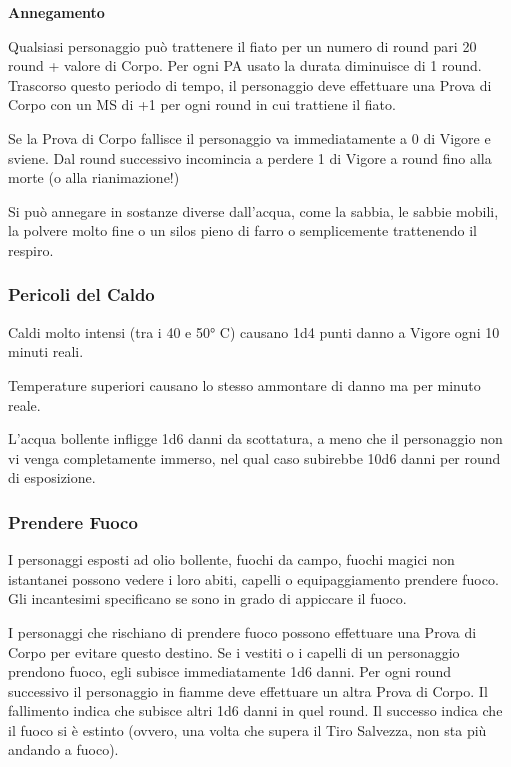 \documentclass[12pt,a4paper,twoside,openany]{book}
\begin{document}
\begin{multicols}{2}
\textbf{Annegamento}\hypertarget{trattenereilfiato}{}

Qualsiasi personaggio può trattenere il fiato per un numero di round pari 20 round + valore di Corpo. Per ogni PA usato la durata diminuisce di 1 round. Trascorso questo periodo di tempo, il personaggio deve effettuare una Prova di Corpo con un MS di +1 per ogni round in cui trattiene il fiato.

Se la Prova di Corpo fallisce il personaggio va immediatamente a 0 di Vigore e sviene. Dal round successivo incomincia a perdere 1 di Vigore a round fino alla morte (o alla rianimazione!)

Si può annegare in sostanze diverse dall'acqua, come la sabbia, le sabbie mobili, la polvere molto fine o un silos pieno di farro o semplicemente trattenendo il respiro.

\subsubsection{Pericoli del Caldo}

\label{pericoli-del-caldo}

Caldi molto intensi (tra i 40 e 50° C) causano 1d4 punti danno a Vigore ogni 10 minuti reali.

Temperature superiori causano lo stesso ammontare di danno ma per minuto reale.

L'acqua bollente infligge 1d6 danni da scottatura, a meno che il personaggio non vi venga completamente immerso, nel qual caso subirebbe 10d6 danni per round di esposizione.

\subsubsection{Prendere Fuoco}

\label{prendere-fuoco}

I personaggi esposti ad olio bollente, fuochi da campo, fuochi magici non istantanei possono vedere i loro abiti, capelli o equipaggiamento prendere fuoco. Gli incantesimi specificano se sono in grado di appiccare il fuoco.

I personaggi che rischiano di prendere fuoco possono effettuare una Prova di Corpo per evitare questo destino. Se i vestiti o i capelli di un personaggio prendono fuoco, egli subisce immediatamente 1d6 danni. Per ogni round successivo il personaggio in fiamme deve effettuare un altra Prova di Corpo. Il fallimento indica che subisce altri 1d6 danni in quel round. Il successo indica che il fuoco si è estinto (ovvero, una volta che supera il Tiro Salvezza, non sta più andando a fuoco).


\end{multicols}
\end{document}
